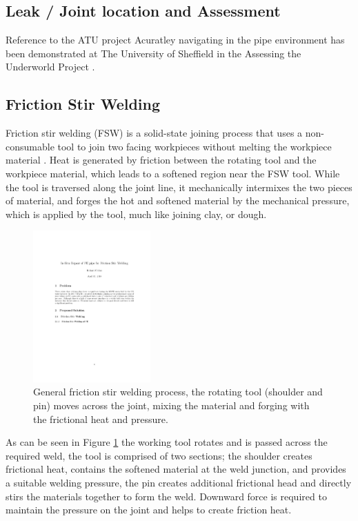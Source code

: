 \documentclass[	DIV=calc,%
							paper=a4,%
							fontsize=11pt,%
							twocolumn]{scrartcl}	 					%
\begin{document}
\subsection*{Leak / Joint location and Assessment}
Reference to the ATU project
Acuratley navigating in the pipe environment has been demonstrated at The University of Sheffield in the Assessing the Underworld Project \cite{}.

\subsection*{Friction Stir Welding}
Friction stir welding (FSW) is a solid-state joining process that uses a non-consumable tool to join two facing workpieces without melting the workpiece material \cite{mishra2005friction}. Heat is generated by friction between the rotating tool and the workpiece material, which leads to a softened region near the FSW tool. While the tool is traversed along the joint line, it mechanically intermixes the two pieces of material, and forges the hot and softened material by the mechanical pressure, which is applied by the tool, much like joining clay, or dough.


\begin{figure}[htp]
 \centering
 \includegraphics[width = 0.4\textwidth]{FrictionStirWeld}
 \caption{General friction stir welding process, the rotating tool (shoulder and pin) moves across the joint, mixing the material and forging with the frictional heat and pressure.}
 \label{FSWProcess}
\end{figure}

As can be seen in Figure \ref{FSWProcess} the working tool rotates and is passed across the required weld, the tool is comprised of two sections; the shoulder creates frictional heat, contains the softened material at the weld junction, and provides a suitable welding pressure,  the pin creates additional frictional head and directly stirs the materials together to form the weld.
Downward force is required to maintain the pressure on the joint and helps to create friction heat.
\end{document}
